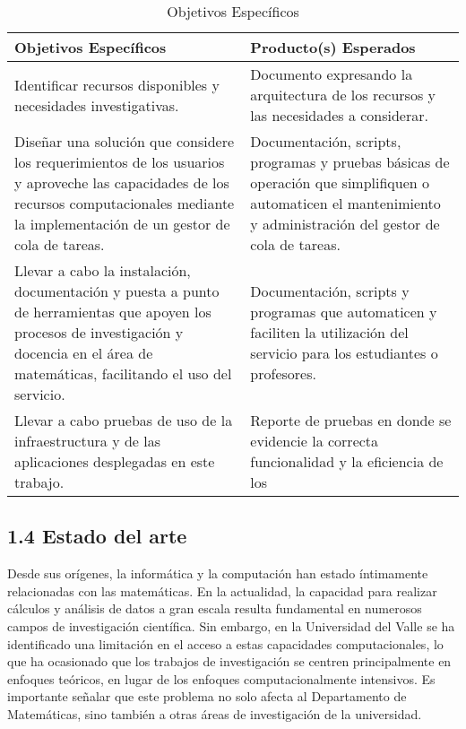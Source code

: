 \begin{spacing}{1.5}
  \begin{table}[h]
    \centering
    \begin{tabular}{p{7cm}|p{7cm}}
      \hline
      \textbf{Objetivos Específicos} & \textbf{Producto(s) Esperados}\\
      \hline
      Identificar recursos disponibles y necesidades investigativas.& Documento expresando la arquitectura de los recursos y las necesidades a considerar. \\
      \hline
      Diseñar una solución que considere los requerimientos de los usuarios y aproveche las capacidades de los recursos computacionales mediante la implementación de un gestor de cola de tareas. & Documentación, scripts, programas y pruebas básicas de operación que simplifiquen o automaticen el mantenimiento y administración del gestor de cola de tareas. \\
      \hline
      Llevar a cabo la instalación, documentación y puesta a punto de herramientas que apoyen los procesos de investigación y docencia en el área de matemáticas, facilitando el uso del servicio. & Documentación, scripts y programas que automaticen y faciliten la utilización del servicio para los estudiantes o profesores.\\
      \hline
      Llevar a cabo pruebas de uso de la infraestructura y de las aplicaciones desplegadas en este trabajo. & Reporte de pruebas en donde se evidencie la correcta funcionalidad y la eficiencia de los \\
      \hline
    \end{tabular}
    \caption{Objetivos Específicos}
    \label{table:table1}
  \end{table}

  \subsection{1.4 Estado del arte}

  Desde sus orígenes, la informática y la computación han estado íntimamente relacionadas con las matemáticas. En la actualidad, la capacidad para realizar cálculos y análisis de datos a gran escala resulta fundamental en numerosos campos de investigación científica. Sin embargo, en la Universidad del Valle se ha identificado una limitación en el acceso a estas capacidades computacionales, lo que ha ocasionado que los trabajos de investigación se centren principalmente en enfoques teóricos, en lugar de los enfoques computacionalmente intensivos. Es importante señalar que este problema no solo afecta al Departamento de Matemáticas, sino también a otras áreas de investigación de la universidad.


\end{spacing}

